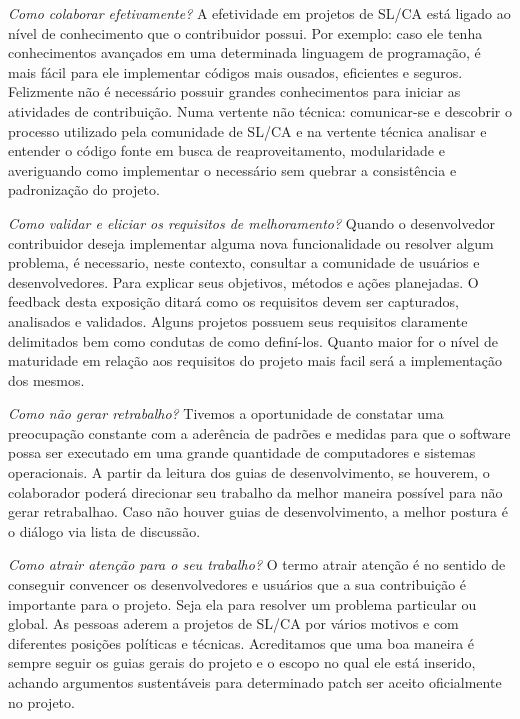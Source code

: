 \textit{Como colaborar efetivamente?} A efetividade em projetos de SL/CA está ligado ao nível de conhecimento que o contribuidor possui. Por exemplo: caso ele tenha conhecimentos avançados em uma determinada linguagem de programação, é mais fácil para ele implementar códigos mais ousados, eficientes e seguros. Felizmente não é necessário possuir grandes conhecimentos para iniciar as atividades de contribuição. Numa vertente não técnica: comunicar-se e descobrir o processo utilizado pela comunidade de SL/CA e na vertente técnica analisar e entender o código fonte em busca de reaproveitamento, modularidade e averiguando como implementar o necessário sem quebrar a consistência e padronização do projeto.

% 

\textit{Como validar e eliciar os requisitos de melhoramento?} Quando o desenvolvedor contribuidor deseja implementar alguma nova funcionalidade ou resolver algum problema, é necessario, neste contexto, consultar a comunidade de usuários e desenvolvedores. Para explicar seus objetivos, métodos e ações planejadas. O feedback desta exposição ditará como os requisitos devem ser capturados, analisados e validados. Alguns projetos possuem seus requisitos claramente delimitados bem como condutas de como definí-los. Quanto maior for o nível de maturidade em relação aos requisitos do projeto mais facil será a implementação dos mesmos.

\textit{Como não gerar retrabalho?} Tivemos a oportunidade de constatar uma preocupação constante com a aderência de padrões e medidas para que o software possa ser executado em uma grande quantidade de computadores e sistemas operacionais. A partir da leitura dos guias de desenvolvimento, se houverem, o colaborador poderá direcionar seu trabalho da melhor maneira possível para não gerar retrabalhao. Caso não houver guias de desenvolvimento, a melhor postura é o diálogo via lista de discussão.

\textit{Como atrair atenção para o seu trabalho?} O termo atrair atenção é no sentido de conseguir convencer os desenvolvedores e usuários que a sua contribuição é importante para o projeto. Seja ela para resolver um problema particular ou global. As pessoas aderem a projetos de SL/CA por vários motivos e com diferentes posições políticas e técnicas. Acreditamos que uma boa maneira é sempre seguir os guias gerais do projeto e o escopo no qual ele está inserido, achando argumentos sustentáveis para determinado patch ser aceito oficialmente no projeto.

